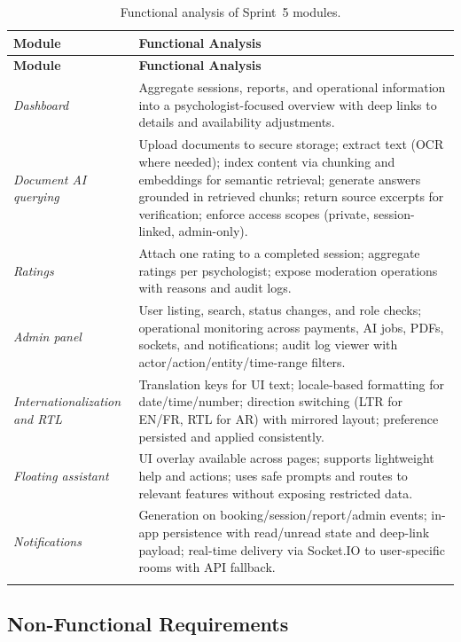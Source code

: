 \documentclass[a4paper,12pt]{report}
\begin{document}
\begin{longtable}{@{} L{0.27\textwidth} L{0.65\textwidth} @{}}
\toprule
\textbf{Module} &
\textbf{Functional Analysis} \\
\midrule
\endfirsthead

\toprule
\textbf{Module} &
\textbf{Functional Analysis} \\
\midrule
\endhead

\emph{Dashboard} & Aggregate sessions, reports, and operational information into a
psychologist-focused overview with deep links to details and availability adjustments. \\
\midrule
\emph{Document AI querying} & Upload documents to secure storage; extract text (OCR
where needed); index content via chunking and embeddings for semantic retrieval;
generate answers grounded in retrieved chunks; return source excerpts for
verification; enforce access scopes (private, session-linked, admin-only). \\
\midrule
\emph{Ratings} & Attach one rating to a completed session; aggregate ratings per
psychologist; expose moderation operations with reasons and audit logs. \\
\midrule
\emph{Admin panel} & User listing, search, status changes, and role checks;
operational monitoring across payments, AI jobs, PDFs, sockets, and notifications;
audit log viewer with actor/action/entity/time-range filters. \\
\midrule
\emph{Internationalization and RTL} & Translation keys for UI text; locale-based
formatting for date/time/number; direction switching (LTR for EN/FR, RTL for AR)
with mirrored layout; preference persisted and applied consistently. \\
\midrule
\emph{Floating assistant} & UI overlay available across pages; supports lightweight
help and actions; uses safe prompts and routes to relevant features without
exposing restricted data. \\
\midrule
\emph{Notifications} & Generation on booking/session/report/admin events; in-app
persistence with read/unread state and deep-link payload; real-time delivery via
Socket.IO to user-specific rooms with API fallback. \\
\bottomrule
\caption{Functional analysis of Sprint~5 modules.}
\label{tab:sprint5-functional-analysis}\\
\end{longtable}

\subsection{Non-Functional Requirements}
\end{document}
